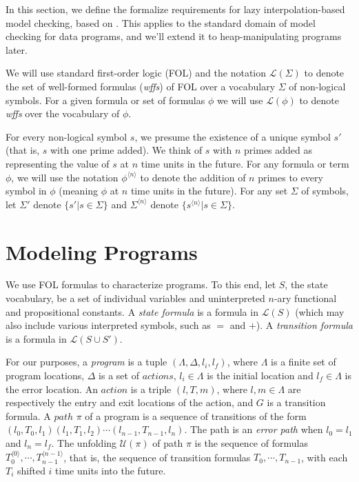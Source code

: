 \label{ch:background}

In this section, we define the formalize requirements for lazy interpolation-based model checking, based on \cite{mcmillan06}. This applies to the standard domain of model checking for data programs, and we'll extend it to heap-manipulating programs later.

We will use standard first-order logic (FOL) and the notation $\mathcal{L}(\Sigma)$ to denote the set of well-formed formulas (\textit{wffs}) of FOL over a vocabulary $\Sigma$ of non-logical symbols. For a given formula or set of formulas $\phi$ we will use $\mathcal{L}(\phi)$ to denote \textit{wffs} over the vocabulary of $\phi$.

For every non-logical symbol $s$, we presume the existence of a unique symbol $s'$ (that is, $s$ with one prime added). We think of $s$ with $n$ primes added as representing the value of $s$ at $n$ time units in the future. For any formula or term $\phi$, we will use the notation $\phi^{\langle n \rangle}$ to denote the addition of $n$ primes to every symbol in $\phi$ (meaning $\phi$ at $n$ time units in the future). For any set $\Sigma$ of symbols, let $\Sigma'$ denote $\{ s' | s \in \Sigma \}$ and $\Sigma^{\langle n \rangle}$ denote $\{ s^{\langle n \rangle} | s \in \Sigma \}$.

\section{Modeling Programs}
\label{sec:modeling-programs}

We use FOL formulas to characterize programs. To this end, let $S$, the state vocabulary, be a set of individual variables and uninterpreted $n$-ary functional and propositional constants. A \textit{state formula} is a formula in $\mathcal{L}(S)$ (which may also include various interpreted symbols, such as $=$ and $+$). A \textit{transition formula} is a formula in $\mathcal{L}(S \cup S')$.

For our purposes, a \textit{program} is a tuple $(\Lambda, \Delta, l_i, l_f)$, where $\Lambda$ is a finite set of program locations, $\Delta$ is a set of $actions$, $l_i \in \Lambda$ is the initial location and $l_f \in \Lambda$ is the error location. An $action$ is a triple $(l, T, m)$, where $l,m \in \Lambda$ are respectively the entry and exit locations of the action, and $G$ is a transition formula. A $path$ $\pi$ of a program is a sequence of transitions of the form $(l_0, T_0, l_1)(l_1, T_1, l_2) \cdots (l_{n-1}, T_{n-1}, l_n)$. The path is an \textit{error path} when $l_0 = l_1$ and $l_n = l_f$. The unfolding $\mathcal{U}(\pi)$ of path $\pi$ is the sequence of formulas $T_0^{\langle 0 \rangle}, \cdots, T_{n-1}^{\langle n-1 \rangle}$, that is, the sequence of transition formulas $T_0, \cdots, T_{n-1}$, with each $T_i$ shifted $i$ time units into the future.

